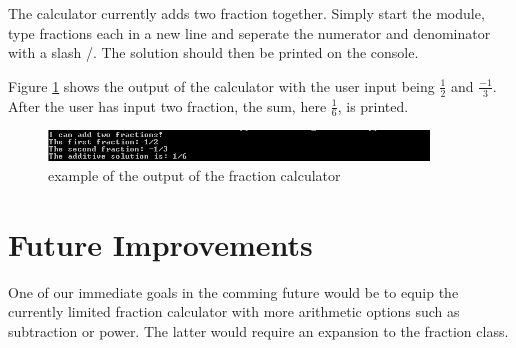 \documentclass[refman]{scrartcl}
\begin{document}
The calculator currently adds two fraction together. Simply start the module, type fractions each in a new line and seperate the numerator and denominator with a slash /. The solution should then be printed on the console.

Figure \ref{fig:example} shows the output of the calculator with the user input being \(\frac{1}{2}\) and \(\frac{-1}{3}\). After the user has input two fraction, the sum, here \(\frac{1}{6}\), is printed.

\begin{figure}[h]
	\centering
		\includegraphics[width=0.9\textwidth]{graphics/calculator_example}
	\caption{example of the output of the fraction calculator}\label{fig:example}
\end{figure}

\section{Future Improvements}

One of our immediate goals in the comming future would be to equip the currently limited fraction calculator with more arithmetic options such as subtraction or power. The latter would require an expansion to the fraction class.
\end{document}
